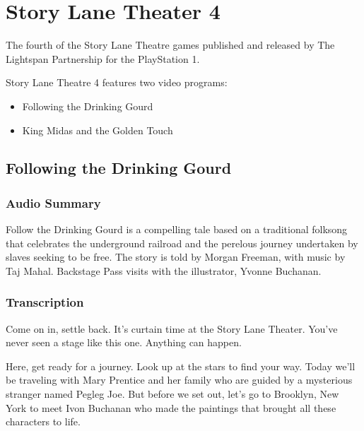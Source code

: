 \chapter{Story Lane Theater 4}


The fourth of the Story Lane Theatre games published and released by The Lightspan Partnership for the PlayStation 1.

Story Lane Theatre 4 features two video programs:

\begin{itemize}
    \item Following the Drinking Gourd
    \item King Midas and the Golden Touch
\end{itemize}

\clearpage
\newpage

\section{Following the Drinking Gourd}

\subsection{Audio Summary}

Follow the Drinking Gourd is a compelling tale based on a traditional folksong that celebrates the underground railroad and the perelous journey undertaken by slaves seeking to be free. The story is told by Morgan Freeman, with music by Taj Mahal. Backstage Pass visits with the illustrator, Yvonne Buchanan.

\subsection{Transcription}

Come on in, settle back. It's curtain time at the Story Lane Theater. You've never seen a stage like this one. Anything can happen.

Here, get ready for a journey. Look up at the stars to find your way. Today we'll be traveling with Mary Prentice and her family who are guided by a mysterious stranger named Pegleg Joe. But before we set out, let's go to Brooklyn, New York to meet Ivon Buchanan who made the paintings that brought all these characters to life.

